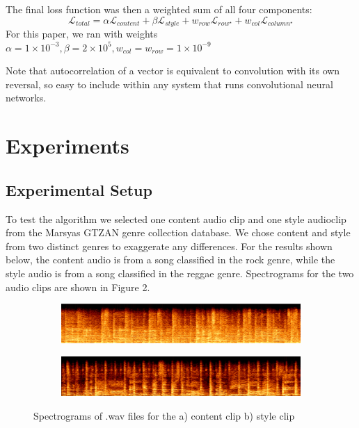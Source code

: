 \documentclass{article}
\begin{document}
The final loss function was then a weighted sum of all four components:
$$
\mathcal{L}_{total} = \alpha \mathcal{L}_{content} + \beta \mathcal{L}_{style} + w_{row} \mathcal{L}_{row^\star} + w_{col} \mathcal{L}_{column^\star}
$$
For this paper, we ran with weights $\alpha = 1\times10^{-3}, \beta = 2\times10^{5}, w_{col} = w_{row} = 1\times10^{-9}$

Note that autocorrelation of a vector is equivalent to convolution with its own reversal, so easy to include within any system that runs convolutional neural networks.

\section{Experiments}

\subsection{Experimental Setup}

To test the algorithm we selected one content audio clip and one style audioclip from the Marsyas GTZAN genre collection database. We chose content and style from two distinct genres to exaggerate any differences. For the results shown below, the content audio is from a song classified in the rock genre, while the style audio is from a song classified in the reggae genre. Spectrograms for the two audio clips are shown in Figure 2.

\begin{figure}[h]
\begin{subfigure}{\textwidth}
  \centering
  \includegraphics[width = \textwidth]{content_spec}
  \caption{}
\end{subfigure}
\begin{subfigure}{\textwidth}
  \centering
  \includegraphics[width = \textwidth]{style_spec}
  \caption{}
\end{subfigure}
\caption{Spectrograms of .wav files for the a) content clip b) style clip}
\end{figure}
\end{document}
